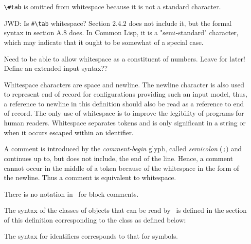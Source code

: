 %
\begin{optPrivate}
    \verb+\#tab+ is omitted from whitespace because it is not a standard
    character.

    JWD: Is \verb+#\tab+ whitespace?  Section 2.4.2 does not include it, but the
    formal syntax in section A.8 does.  In Common Lisp, it is a "semi-standard"
    character, which may indicate that it ought to be somewhat of a special
    case.

    Need to be able to allow whitespace as a constituent of numbers.  Leave for
    later!  Define an extended input syntax??
\end{optPrivate}
%
\begin{optDefinition}
Whitespace characters are space and
newline.  The newline character is also used to represent end of record for
configurations providing such an input model, thus, a reference to newline in
this definition should also be read as a reference to end of record.  The only
use of whitespace is to improve the legibility of programs for human readers.
Whitespace separates tokens and is only significant in a string or when it
occurs escaped within an identifier.

A comment is introduced by the {\em
    comment-begin} glyph,
called {\em semicolon} (\verb+;+) and continues up to, but does not include, the
end of the line.  Hence, a comment cannot occur in the middle of a token because
of the whitespace in the form of the newline.  Thus a comment is equivalent to
whitespace.
%
\begin{note}
    There is no notation in \eulisp\ for block comments.
\end{note}
\end{optDefinition}
%
\begin{optDefinition}
The syntax of the classes of objects that can be read by \eulisp\ is defined in
the section of this definition corresponding to the class as defined below:
%
\Syntax
\label{object-syntax}

The syntax for identifiers 
 corresponds to that for symbols.
%
\end{optDefinition}
